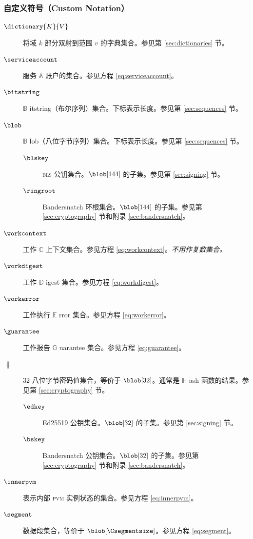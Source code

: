 \subsubsection{自定义符号（Custom Notation）}
\begin{description}
  \item[$\dictionary{K}{V}$] 将域 $k$ 部分双射到范围 $v$ 的字典集合。参见第 \ref{sec:dictionaries} 节。
  \item[$\serviceaccount$] 服务 $\mathbb{A}$ 账户的集合。参见方程 \ref{eq:serviceaccount}。
  \item[$\bitstring$] $\mathbb{B}$ itstring（布尔序列）集合。下标表示长度。参见第 \ref{sec:sequences} 节。
  \item[$\blob$] $\mathbb{B}$ lob（八位字节序列）集合。下标表示长度。参见第 \ref{sec:sequences} 节。
  \begin{description}
    \item[$\blskey$] \textsc{bls} 公钥集合。$\blob[144]$ 的子集。参见第 \ref{sec:signing} 节。
    \item[$\ringroot$] Bandersnatch 环根集合。$\blob[144]$ 的子集。参见第 \ref{sec:cryptography} 节和附录 \ref{sec:bandersnatch}。
  \end{description}
  \item[$\workcontext$] 工作 $\mathbb{C}$ 上下文集合。参见方程 \ref{eq:workcontext}。\emph{不用作复数集合。}
  \item[$\workdigest$] 工作 $\mathbb{D}$ igest 集合。参见方程 \ref{eq:workdigest}。
  \item[$\workerror$] 工作执行 $\mathbb{E}$ rror 集合。参见方程 \ref{eq:workerror}。
  \item[$\guarantee$] 工作报告 $\mathbb{G}$ uarantee 集合。参见方程 \ref{eq:guarantee}。
  \item[$\hash$] 32 八位字节密码值集合，等价于 $\blob[32]$。通常是 $\mathbb{H}$ ash 函数的结果。参见第 \ref{sec:cryptography} 节。
  \begin{description}
    \item[$\edkey$] Ed25519 公钥集合。$\blob[32]$ 的子集。参见第 \ref{sec:signing} 节。
    \item[$\bskey$] Bandersnatch 公钥集合。$\blob[32]$ 的子集。参见第 \ref{sec:cryptography} 节和附录 \ref{sec:bandersnatch}。
  \end{description}
  \item[$\innerpvm$] 表示内部 \textsc{pvm} 实例状态的集合。参见方程 \ref{eq:innerpvm}。
  \item[$\segment$] 数据段集合，等价于 $\blob[\Csegmentsize]$。参见方程 \ref{eq:segment}。

\end{description}
